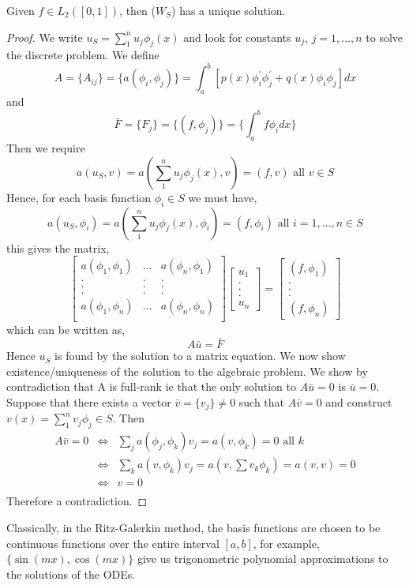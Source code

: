\begin{theorem}
Given $f\in L_2([0,1])$, then ($W_S$) has a unique solution.
\end{theorem}
\begin{proof}
We write $u_S=\sum_{1}^{n}u_j\phi_j(x)$ and look for constants $u_j$, $j=1,...,n$
to solve the discrete problem. We define
\[A=\{A_{ij} \}=\{a(\phi_i,\phi_j)\}=\int_a^b[p(x)\phi_i^{'}\phi_j^{'}+q(x)\phi_i\phi_j ]dx \]
and 
\[\bar{F}=\{F_{j} \}=\{(f,\phi_j)\}=\{\int_a^bf\phi_i dx \} \]
Then we require
\[a(u_S,v)=a(\sum_{1}^{n}u_j\phi_j(x),v)=(f,v) \mbox{ all } v \in S \]
Hence, for each basis function $\phi_i\in S$ we must have,
\[a(u_S,\phi_i)=a(\sum_{1}^{n}u_j\phi_j(x),\phi_i)=(f,\phi_i) \mbox{ all } i=1,...,n \in S \]
this gives the matrix,
\[\left[\begin{array}{ccc}
a(\phi_1,\phi_1)&...&a(\phi_n,\phi_1)\\
.&.&.\\
.&.&.\\
.&.&.\\
a(\phi_1,\phi_n)&...&a(\phi_n,\phi_n)\\
 \end{array} \right]
 \left[\begin{array}{c} u_1\\ .\\ .\\ .\\ u_n \end{array}
 \right]
=
 \left[\begin{array}{c} (f,\phi_1)\\ .\\ .\\ .\\ (f,\phi_n) \end{array}
 \right]
\]
which can be written as,
\[ A \bar{u}=\bar{F} \]
Hence $u_S$ is found by the solution to a matrix equation. We now show existence/uniqueness
of the solution to the algebraic problem.  We show by contradiction that A is full-rank
ie that the only solution to $A\bar{u}=0$ is $\bar{u}=0$.\\
Suppose that there exists a vector $\bar{v}=\{v_j\}\not=0$ such that $A\bar{v}=0$
and construct $v(x)=\sum_{1}^nv_j\phi_j \in S$. Then
\[\begin{array}{ccl}
A\bar{v}=0&\Leftrightarrow&\sum_j a(\phi_j,\phi_k)v_j=a(v,\phi_k)=0 \mbox{ all } k \\
&\Leftrightarrow&\sum_k a(v,\phi_k)v_j=a(v,\sum v_k\phi_k)=a(v,v)=0 \\
&\Leftrightarrow& v=0 \\
\end{array}
 \]
Therefore a contradiction.
\end{proof}
Classically, in the Ritz-Galerkin method, the basis functions are chosen to be continuous functions over the entire interval $[a,b]$, for example, $\{ \sin (mx), \cos (mx) \}$
give us trigonometric polynomial approximations to the solutions of the ODEs.
